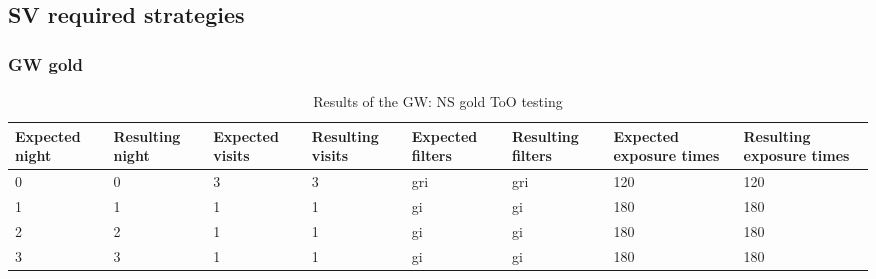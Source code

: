 \subsection{SV required strategies}

\subsubsection{GW gold}


\begin{table}
\centering
\begin{adjustbox}{max width=\textwidth}
\begin{tabular}{|l|l|l|l|l|l|l|l|}
\hline
Expected night & Resulting night & Expected visits & Resulting visits & Expected filters & Resulting filters & Expected exposure times & Resulting exposure times \\ \hline
0              & 0               & 3               & 3                & gri              & gri               & 120                     & 120                      \\ \hline
1              & 1               & 1               & 1                & gi               & gi                & 180                     & 180                      \\ \hline
2              & 2               & 1               & 1                & gi               & gi                & 180                     & 180                      \\ \hline
3              & 3               & 1               & 1                & gi               & gi                & 180                     & 180                      \\ \hline
\end{tabular}
\end{adjustbox}
\caption{Results of the GW: NS gold ToO testing}
\label{tab:GWGoldResults}
\end{table}

